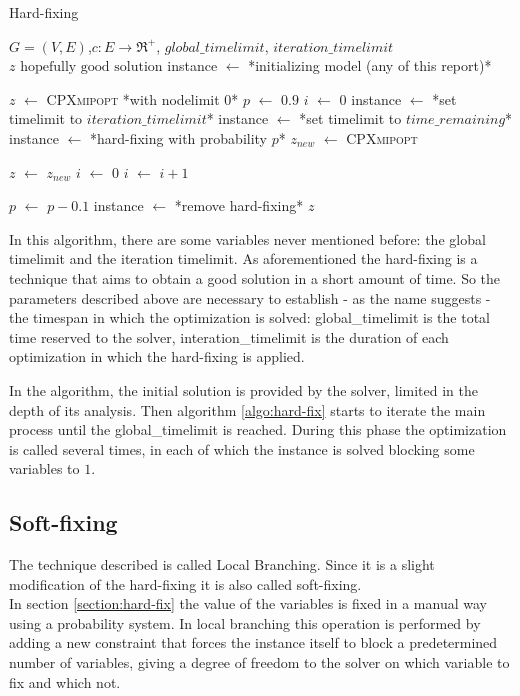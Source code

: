 \begin{algorithm}
	\caption{Hard-fixing}\label{algo:hard-fix}
	\begin{algorithmic}[1]
		\Require $G=(V,E)$,$ c:E\rightarrow \Re^+$, $global\_timelimit$, $iteration\_timelimit$
		\Ensure $z\text{ hopefully good solution}$
		\State instance $\gets$ *initializing model (any of this report)*
		
		\State  $z$ $\gets$ \textsc{CPXmipopt} *with nodelimit 0*
		\State $p$ $\gets$ $0.9$
		\State $i$ $\gets$ $0$
				\State instance $\gets$ *set timelimit to $iteration\_timelimit$*
			\Else 
				\State instance $\gets$ *set timelimit to $time\_remaining$*
			\EndIf
			\State instance $\gets$ *hard-fixing with probability $p$*
			\State $z_{new}$ $\gets$ \textsc{CPXmipopt}
			
				\State $z$ $\gets$ $z_{new}$
				\State $i$ $\gets$ $0$
			\Else 
				\State $i$ $\gets$ $i+1$
			\EndIf
			
				\State $p$ $\gets$ $p - 0.1$
			\EndIf
			\State instance $\gets$ *remove hard-fixing*
		\EndWhile
		\State \Return $z$
	\end{algorithmic}
\end{algorithm}

In this algorithm, there are some variables never mentioned before: the global timelimit and the iteration timelimit. As aforementioned the hard-fixing is a technique that aims to obtain a good solution in a short amount of time. So the parameters described above are necessary to establish - as the name suggests - the timespan in which the optimization is solved: global\_timelimit is the total time reserved to the solver, interation\_timelimit is the duration of each optimization in which the hard-fixing is applied.

In the algorithm, the initial solution is provided by the solver, limited in the depth of its analysis. Then algorithm \ref{algo:hard-fix} starts to iterate the main process until the global\_timelimit is reached. During this phase the optimization is called several times, in each of which the instance is solved blocking some variables to $1$.

\subsection{Soft-fixing}
The technique described is called Local Branching. Since it is a slight modification of the hard-fixing it is also called soft-fixing.\\
In section \ref{section:hard-fix} the value of the variables is fixed in a manual way using a probability system. In local branching this operation is performed by adding a new constraint that forces the instance itself to block a predetermined number of variables, giving a degree of freedom to the solver on which variable to fix and which not.

